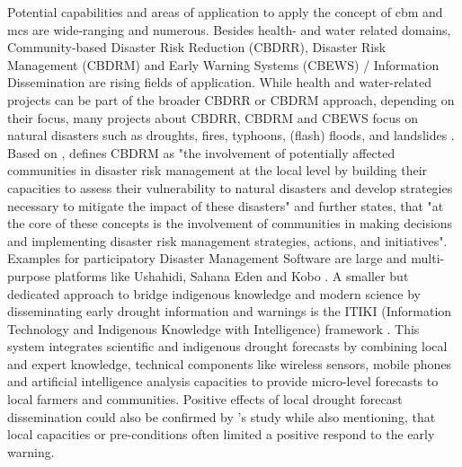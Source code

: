 Potential capabilities and areas of application to apply the concept of \acrshort{cbm} and \acrshort{mcs} are wide-ranging and numerous. Besides health- and water related domains, Community-based Disaster Risk Reduction (CBDRR), Disaster Risk Management (CBDRM) and Early Warning Systems (CBEWS) / Information Dissemination are rising fields of application. While health and water-related projects can be part of the broader CBDRR or CBDRM approach, depending on their focus, many projects about CBDRR, CBDRM and CBEWS focus on natural disasters such as droughts, fires, typhoons, (flash) floods, and landslides \autocite{machereraReviewStudiesCommunity2016,manaloBellBottleTechnology2013,pinedaRedefiningCommunityBased2015,smithCommunitybasedEarlyWarning2017,tarchianiCommunityImpactBased2020,trogrlicIndigenousKnowledgeEarly2018,vhumbunuCountingDayZero2021}. Based on \autocite{unisdrUNISDRTerminologyDisaster2009}, \autocite[198]{vhumbunuCountingDayZero2021} defines CBDRM as "the involvement of potentially affected communities in disaster risk management at the local level by building their capacities to assess their vulnerability to natural disasters and develop strategies necessary to mitigate the impact of these disasters" and further states, that "at the core of these concepts is the involvement of communities in making decisions and implementing disaster risk management strategies, actions, and initiatives".\newline
Examples for participatory Disaster Management Software are large and multi-purpose platforms like Ushahidi, Sahana Eden and Kobo \autocite{koboorganizationKoboToolbox,sahanafoundationSahanaEDEN2016,ushahidiCrowdsourcingSolutionsEmpower}. A smaller but dedicated approach to bridge indigenous knowledge and modern science by disseminating early drought information and warnings is the ITIKI (Information Technology and Indigenous Knowledge with Intelligence) framework \autocite{akanbiDevelopmentRuleBasedDrought2018,masindeEffectiveDroughtEarly2014a,masindeImplementationRoadmapDownscaling2013,masindeDownscalingAfricaDrought2018,masindeFrameworkPredictingDroughts2010a,masindeITIKIBridgeAfrican2012,masindeITIKIMobileBased2019,nyetanyaneIntegrationIndigenousKnowledge2020,thothelaSurveyIntelligentAgroclimate2021a}. This system integrates scientific and indigenous drought forecasts by combining local and expert knowledge, technical components like wireless sensors, mobile phones and artificial intelligence analysis capacities to provide micro-level forecasts to local farmers and communities. Positive effects of local drought forecast dissemination could also be confirmed by \autocite{anderssonLocalEarlyWarning2020}'s study while also mentioning, that local capacities or pre-conditions often limited a positive respond to the early warning.\newline
